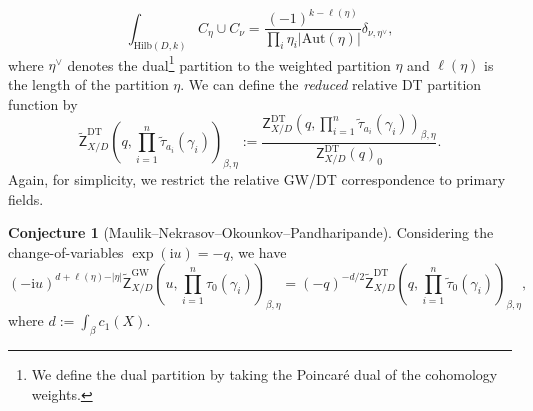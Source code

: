 \documentclass[11pt,colorinlistoftodos]{amsart}
\numberwithin{equation}{subsection}
\theoremstyle{plain}
\theoremstyle{definition}
\newtheorem{Conj}[thm]{Conjecture}
\theoremstyle{remark}
\newcommand{\I}{\mathrm{i}}
\begin{document}
\[
\int_{\mathrm{Hilb}(D,k)}C_\eta\cup C_\nu=\frac{(-1)^{k-\ell(\eta)}}{\prod_{i}\eta_i\vert\mathrm{Aut}(\eta)\vert}\delta_{\nu,\eta^\lor},
\]
where $\eta^\lor$ denotes the dual\footnote{We define the dual partition by taking the Poincar\'e dual of the cohomology weights.} partition to the weighted partition $\eta$ and $\ell(\eta)$ is the length of the partition $\eta$.
We can define the \emph{reduced} relative DT partition function by 
\begin{equation}
    \label{eq:reduced_relative_DT_partition_function}
    \widetilde{\mathsf{Z}}^\mathrm{DT}_{X/D}\left(q,\prod_{i=1}^n\tilde\tau_{a_i}(\gamma_i)\right)_{\beta,\eta}:=\frac{\mathsf{Z}^\mathrm{DT}_{X/D}\left(q,\prod_{i=1}^n \tilde\tau_{a_i}(\gamma_i)\right)_{\beta,\eta}}{\mathsf{Z}^\mathrm{DT}_{X/D}(q)_0}.
\end{equation}
Again, for simplicity, we restrict the relative GW/DT correspondence to primary fields. 
\begin{Conj}[Maulik--Nekrasov--Okounkov--Pandharipande\cite{MaulikNekreasovOkounkovPandharipande2006_2}]
Considering the change-of-variables $\exp(\I u)=-q$, we have
\[
(-\I u)^{d+\ell(\eta)-\vert\eta\vert}\widetilde{\mathsf{Z}}^\mathrm{GW}_{X/D}\left(u,\prod_{i=1}^n\tau_0(\gamma_i)\right)_{\beta,\eta}=(-q)^{-d/2}\widetilde{\mathsf{Z}}^\mathrm{DT}_{X/D}\left(q,\prod_{i=1}^n\tilde\tau_0(\gamma_i)\right)_{\beta,\eta},
\]
where $d:=\int_\beta c_1(X)$.
\end{Conj}
\end{document}
